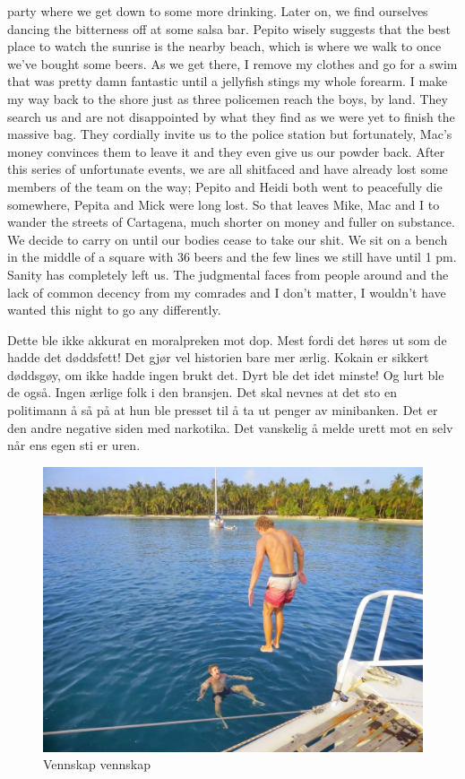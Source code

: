 {	party where we get down to some more drinking. Later on, we
	find ourselves dancing the bitterness off at some salsa bar.
	Pepito wisely suggests that the best place to watch the
	sunrise is the nearby beach, which is where we walk to once
	we’ve bought some beers. As we get there, I remove my clothes
	and go for a swim that was pretty damn fantastic until a
	jellyfish stings my whole forearm. I make my way back to the
	shore just as three policemen reach the boys, by land. They
	search us and are not disappointed by what they find as we
	were yet to finish the massive bag. They cordially invite us
	to the police station but fortunately, Mac’s money convinces
	them to leave it and they even give us our powder back. 
	After this series of unfortunate events, we are all shitfaced
	and have already lost some members of the team on the way;
	Pepito and Heidi both went to peacefully die somewhere, Pepita
	and Mick were long lost. So that leaves Mike, Mac and I to
	wander the streets of Cartagena, much shorter on money and
	fuller on substance. We decide to carry on until our bodies
	cease to take our shit. We sit on a bench in the middle of a
	square with 36 beers and the few lines we still have until 1
	pm. Sanity has completely left us. The judgmental faces from
	people around and the lack of common decency from my comrades
	and I don’t matter, I wouldn’t have wanted this night to go
any differently.}


Dette ble ikke akkurat en moralpreken mot dop. Mest fordi det høres ut
som de hadde det døddsfett! Det gjør vel historien bare mer ærlig.
Kokain er sikkert døddsgøy, om ikke hadde ingen brukt det. Dyrt ble det idet minste! Og lurt
ble de også. Ingen ærlige folk i den bransjen. Det skal nevnes at det sto en
politimann å så på at hun ble presset til å ta ut penger av
minibanken. Det er den andre negative siden med narkotika. Det
vanskelig å melde urett mot en selv når ens egen sti er uren.
\begin{figure}[h]
	\centering
	\includegraphics[width=\textwidth]{vennskapvol2}
	\caption*{Vennskap vennskap}
	\label{fig:vennskap}
\end{figure}


